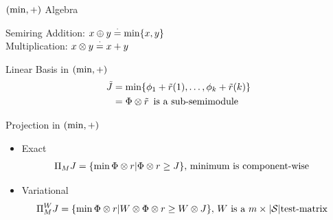\documentclass[10pt,handout]{beamer}
\begin{document}
\begin{frame}[fragile]{$(\min,+)$ Algebra}

\begin{block}{Semiring}
Addition: $x\oplus y\stackrel{\cdot}{=}\min\{x,y\}$\\
Multiplication: $x\otimes y\stackrel{\cdot}{=} x+y$
\end{block}

\begin{block}{Linear Basis in $(\min,+)$ }
\begin{align*}
\tilde{J}&=\min\{\phi_{1}+\tilde{r}(1),\ldots,\phi_{k}+\tilde{r}(k)\}\\
&=\Phi \otimes \tilde{r} \,\text{~is~a~sub-semimodule}
\end{align*}
\end{block}
\begin{block}{Projection in $(\min,+)$}
\begin{itemize}
\item Exact
\begin{align*}
\Pi_M J&=\{\min \Phi \otimes r | \Phi \otimes r \geq J\},\,\text{minimum~is~component-wise}
\end{align*}
\item Variational
\begin{align*}
\Pi^W_M J&=\{\min \Phi \otimes r | W\otimes \Phi \otimes r \geq W\otimes J\},\,W\text{~is~a~$m\times |\mathcal{S}|$test-matrix}
\end{align*}
\end{itemize}
\end{block}
\end{frame}
\end{document}
